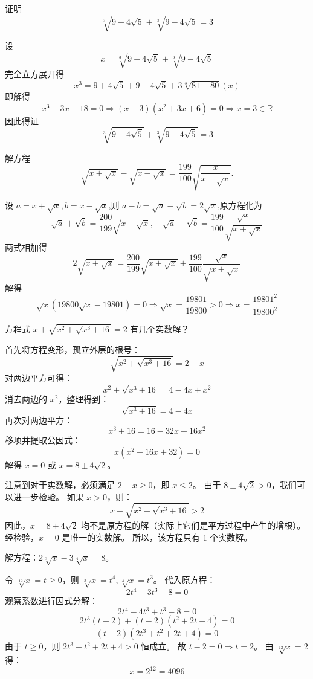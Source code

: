 \begin{questions}
    \question 证明
    \[
    \sqrt[3]{9+4\sqrt{5}}+\sqrt[3]{9-4\sqrt{5}}=3
    \]
    \begin{solution}
        设
        \[
        x=\sqrt[3]{9+4\sqrt{5}}+\sqrt[3]{9-4\sqrt{5}}
        \]
        完全立方展开得
        \[
        x^3=9+4\sqrt{5}+9-4\sqrt{5}+3\sqrt[3]{81-80}(x)
        \]
        即解得
        \[
        x^3-3x-18=0 \Rightarrow (x-3)(x^2 + 3x + 6) = 0 \Rightarrow x=3 \in \mathbb{R}
        \]
        因此得证
        \[
        \sqrt[3]{9+4\sqrt{5}}+\sqrt[3]{9-4\sqrt{5}}=3
        \]
    \end{solution}

    \question 解方程
    \[
    \sqrt{x+\sqrt{x}} - \sqrt{x-\sqrt{x}} = \frac{199}{100} \sqrt{\frac{x}{x+\sqrt{x}}}.
    \]
    \begin{solution}
        设 $a=x+\sqrt{x}, b=x-\sqrt{x}$,则 $a-b=\sqrt{a}-\sqrt{b}=2\sqrt{x}$,原方程化为
        \[
        \sqrt{a}+\sqrt{b} = \frac{200}{199}\sqrt{x+\sqrt{x}}, \quad
        \sqrt{a}-\sqrt{b} = \frac{199}{100}\frac{\sqrt{x}}{\sqrt{x+\sqrt{x}}}
        \]
        两式相加得
        \[
        2\sqrt{x+\sqrt{x}}= \frac{200}{199}\sqrt{x+\sqrt{x}}+\frac{199}{100}\frac{\sqrt{x}}{\sqrt{x+\sqrt{x}}}
        \]
        解得
        \[
        \sqrt{x}(19800\sqrt{x}-19801)=0 \Rightarrow \sqrt{x} = \frac{19801}{19800}>0 \Rightarrow x = \frac{19801^2}{19800^2}
        \]
    \end{solution}

    \question
方程式 $x + \sqrt{x^2 + \sqrt{x^3 + 16}} = 2$ 有几个实数解？

\begin{solution}
首先将方程变形，孤立外层的根号：
\[
\sqrt{x^2 + \sqrt{x^3 + 16}} = 2 - x
\]
对两边平方可得：
\[
x^2 + \sqrt{x^3 + 16} = 4 - 4x + x^2
\]
消去两边的 $x^2$，整理得到：
\[
\sqrt{x^3 + 16} = 4 - 4x
\]
再次对两边平方：
\[
x^3 + 16 = 16 - 32x + 16x^2
\]
移项并提取公因式：
\[
x(x^2 - 16x + 32) = 0
\]
解得 $x = 0$ 或 $x = 8 \pm 4\sqrt{2}$。

注意到对于实数解，必须满足 $2 - x \ge 0$，即 $x \le 2$。
由于 $8 \pm 4\sqrt{2} > 0$，我们可以进一步检验。
如果 $x > 0$，则：
\[
x + \sqrt{x^2 + \sqrt{x^3 + 16}} > 2
\]
因此，$x = 8 \pm 4\sqrt{2}$ 均不是原方程的解（实际上它们是平方过程中产生的增根）。
经检验，$x = 0$ 是唯一的实数解。
所以，该方程只有 1 个实数解。
\end{solution}

\question 解方程：$2\sqrt[3]{x} - 3\sqrt[4]{x} = 8$。

\begin{solution}
令 $\sqrt[12]{x} = t \ge 0$，则 $\sqrt[3]{x} = t^4, \sqrt[4]{x} = t^3$。
代入原方程：
\[
2t^4 - 3t^3 - 8 = 0
\]
观察系数进行因式分解：
\[
2t^4 - 4t^3 + t^3 - 8 = 0
\]
\[
2t^3(t - 2) + (t - 2)(t^2 + 2t + 4) = 0
\]
\[
(t - 2)(2t^3 + t^2 + 2t + 4) = 0
\]
由于 $t \ge 0$，则 $2t^3 + t^2 + 2t + 4 > 0$ 恒成立。
故 $t - 2 = 0 \Rightarrow t = 2$。
由 $\sqrt[12]{x} = 2$ 得：
\[
x = 2^{12} = 4096
\]
\end{solution}


\end{questions}
